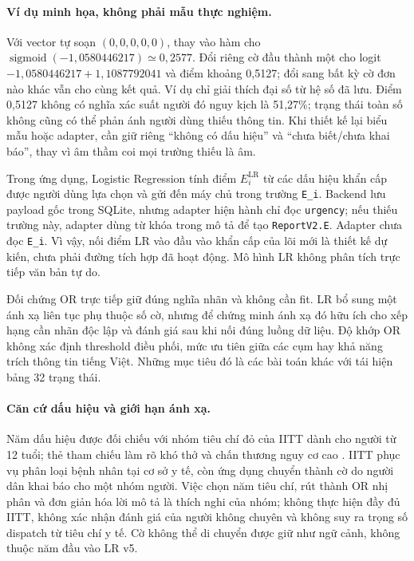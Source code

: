 \paragraph{Ví dụ minh họa, không phải mẫu thực nghiệm.} Với vector tự soạn $(0,0,0,0,0)$, thay vào hàm cho $\operatorname{sigmoid}(-1{,}0580446217)\simeq0{,}2577$. Đổi riêng cờ đầu thành một cho logit $-1{,}0580446217+1{,}1087792041$ và điểm khoảng 0,5127; đổi sang bất kỳ cờ đơn nào khác vẫn cho cùng kết quả. Ví dụ chỉ giải thích đại số từ hệ số đã lưu. Điểm 0,5127 không có nghĩa xác suất người đó nguy kịch là 51,27\%; trạng thái toàn số không cũng có thể phản ánh người dùng thiếu thông tin. Khi thiết kế lại biểu mẫu hoặc adapter, cần giữ riêng ``không có dấu hiệu'' và ``chưa biết/chưa khai báo'', thay vì âm thầm coi mọi trường thiếu là âm.

Trong ứng dụng, Logistic Regression tính điểm $E_i^{\mathrm{LR}}$ từ các dấu hiệu khẩn cấp được người dùng lựa chọn và gửi đến máy chủ trong trường \texttt{E\_i}. Backend lưu payload gốc trong SQLite, nhưng adapter hiện hành chỉ đọc \texttt{urgency}; nếu thiếu trường này, adapter dùng từ khóa trong mô tả để tạo \texttt{ReportV2.E}. Adapter chưa đọc \texttt{E\_i}. Vì vậy, nối điểm LR vào đầu vào khẩn cấp của lõi mới là thiết kế dự kiến, chưa phải đường tích hợp đã hoạt động. Mô hình LR không phân tích trực tiếp văn bản tự do.

Đối chứng OR trực tiếp giữ đúng nghĩa nhãn và không cần fit. LR bổ sung một ánh xạ liên tục phụ thuộc số cờ, nhưng để chứng minh ánh xạ đó hữu ích cho xếp hạng cần nhãn độc lập và đánh giá sau khi nối đúng luồng dữ liệu. Độ khớp OR không xác định threshold điều phối, mức ưu tiên giữa các cụm hay khả năng trích thông tin tiếng Việt. Những mục tiêu đó là các bài toán khác với tái hiện bảng 32 trạng thái.

\paragraph{Căn cứ dấu hiệu và giới hạn ánh xạ.} Năm dấu hiệu được đối chiếu với nhóm tiêu chí đỏ của IITT dành cho người từ 12 tuổi; thẻ tham chiếu làm rõ khó thở và chấn thương nguy cơ cao \citep{whoIITT,whoIITTAdult,whoIITTReference}. IITT phục vụ phân loại bệnh nhân tại cơ sở y tế, còn ứng dụng chuyển thành cờ do người dân khai báo cho một nhóm người. Việc chọn năm tiêu chí, rút thành OR nhị phân và đơn giản hóa lời mô tả là thích nghi của nhóm; không thực hiện đầy đủ IITT, không xác nhận đánh giá của người không chuyên và không suy ra trọng số dispatch từ tiêu chí y tế. Cờ không thể di chuyển được giữ như ngữ cảnh, không thuộc năm đầu vào LR v5.


